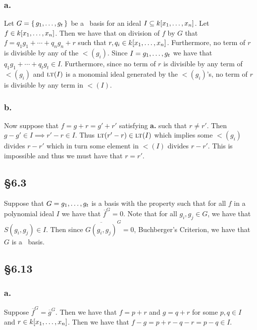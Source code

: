 \documentclass[letterpaper]{article}
\begin{document}
\subsubsection*{a.}

Let $G = \set{g_{1}, \ldots, g_{t}}$ be a \Grobner\ basis for an ideal $I \subseteq k\bqty{x_{1}, \ldots, x_{n}}$.
Let $f \in k\bqty{x_{1}, \ldots, x_{n}}$.
Then we have that on division of $f$ by $G$ that $f = q_{1}g_{1} + \cdots + q_{n}g_{n} + r$ such that $r, q_{i} \in k\bqty{x_{1}, \ldots, x_{n}}$.
Furthermore, no term of $r$ is divisible by any of the $\lt(g_{i})$.
Since $I = \gen{g_{1}, \ldots, g_{t}}$ we have that $q_{1}g_{1} + \cdots + q_{t}g_{t} \in I$.
Furthermore, since no term of $r$ is divisible by any term of $\lt(g_{i})$ and $\gen{\lt(I)}$ is a monomial ideal generated by the $\lt(g_{i})$'s, no term of $r$ is divisible by any term in $\lt(I)$.

\subsubsection*{b.}

Now suppose that $f = g + r = g' + r'$ satisfying \textbf{a.} such that $r \neq r'$.
Then $g - g' \in I \implies r' - r \in I$.
Thus $\lt(r' - r) \in \gen{\lt(I)}$ which implies some $\lt(g_{i})$ divides $r - r'$ which in turn some element in $\lt(I)$ divides $r - r'$.
This is impossible and thus we must have that $r = r'$.

\subsection*{\S 6.3}

Suppose that $G = \gen{g_{1}, \ldots, g_{t}}$ is a basis with the property such that for all $f$ in a polynomial ideal $I$ we have that $\overline{f}^{G} = 0$.
Note that for all $g_{i}, g_{j} \in G$, we have that $S(g_{i}, g_{j}) \in I$.
Then since $\overline{G(g_{i}, g_{j})}^{G} = 0$, Buchberger's Criterion, we have that $G$ is a \Grobner\ basis.

\subsection*{\S 6.13}

\subsubsection*{a.}

Suppose $\overline{f}^{G} = \overline{g}^{G}$.
Then we have that $f = p + r$ and $g = q + r$ for some $p, q \in I$ and $r \in k\bqty{x_{1}, \ldots, x_{n}}$.
Then we have that $f - g = p + r - q - r = p - q \in I$.
\end{document}
